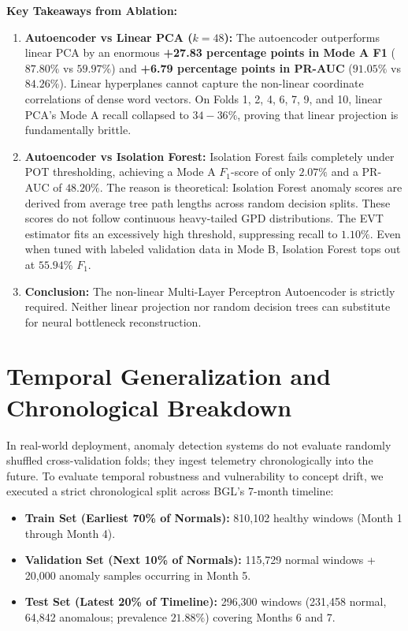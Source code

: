 \textbf{Key Takeaways from Ablation:}
\begin{enumerate}
    \item \textbf{Autoencoder vs Linear PCA ($k=48$):} The autoencoder outperforms linear PCA by an enormous \textbf{+27.83 percentage points in Mode A F1} ($87.80\%$ vs $59.97\%$) and \textbf{+6.79 percentage points in PR-AUC} ($91.05\%$ vs $84.26\%$). Linear hyperplanes cannot capture the non-linear coordinate correlations of dense word vectors. On Folds 1, 2, 4, 6, 7, 9, and 10, linear PCA's Mode A recall collapsed to $34-36\%$, proving that linear projection is fundamentally brittle.
    \item \textbf{Autoencoder vs Isolation Forest:} Isolation Forest fails completely under POT thresholding, achieving a Mode A $F_1$-score of only $\mathbf{2.07\%}$ and a PR-AUC of $\mathbf{48.20\%}$. The reason is theoretical: Isolation Forest anomaly scores are derived from average tree path lengths across random decision splits. These scores do not follow continuous heavy-tailed GPD distributions. The EVT estimator fits an excessively high threshold, suppressing recall to $1.10\%$. Even when tuned with labeled validation data in Mode B, Isolation Forest tops out at $55.94\%$ $F_1$.
    \item \textbf{Conclusion:} The non-linear Multi-Layer Perceptron Autoencoder is strictly required. Neither linear projection nor random decision trees can substitute for neural bottleneck reconstruction.
\end{enumerate}

\section{Temporal Generalization and Chronological Breakdown}
\label{sec:results_chronological}
In real-world deployment, anomaly detection systems do not evaluate randomly shuffled cross-validation folds; they ingest telemetry chronologically into the future. To evaluate temporal robustness and vulnerability to concept drift, we executed a strict chronological split across BGL's 7-month timeline:
\begin{itemize}
    \item \textbf{Train Set (Earliest 70\% of Normals):} 810,102 healthy windows (Month 1 through Month 4).
    \item \textbf{Validation Set (Next 10\% of Normals):} 115,729 normal windows + 20,000 anomaly samples occurring in Month 5.
    \item \textbf{Test Set (Latest 20\% of Timeline):} 296,300 windows (231,458 normal, 64,842 anomalous; prevalence $21.88\%$) covering Months 6 and 7.
\end{itemize}

